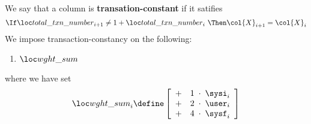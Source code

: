 We say that a column  is \textbf{transation-constant} if it satifies
\[
	\If   \totalTransactionNumber _{i + 1} \neq 1 + \totalTransactionNumber _{i} ~
	\Then \col{X} _{i + 1} = \col{X} _{i}
\]
We impose transaction-constancy on the following:
\begin{enumerate}
        \item $\weightedFlagSum$
\end{enumerate}
where we have set
\[
	\weightedFlagSum _{i} \define
	\left[ \begin{array}{crcl}
		+ & 1 & \!\!\! \cdot \!\!\! & \sysi _{i} \\
		+ & 2 & \!\!\! \cdot \!\!\! & \user _{i} \\
		+ & 4 & \!\!\! \cdot \!\!\! & \sysf _{i} \\
	\end{array} \right]
\]
